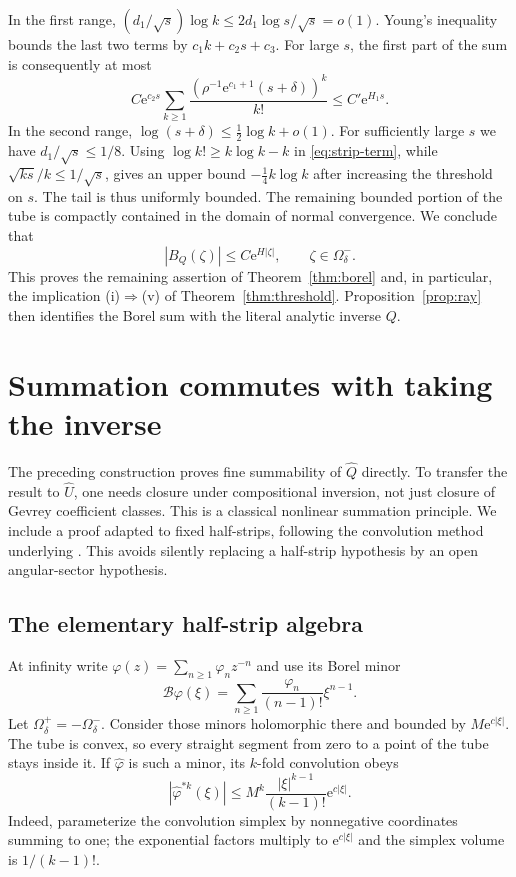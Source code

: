 \documentclass[11pt,a4paper]{article}
\numberwithin{equation}{section}
\theoremstyle{definition}
\theoremstyle{remark}
\newcommand{\U}{\widehat U}
\newcommand{\Q}{\widehat Q}
\newcommand{\ee}{\mathrm e}
\begin{document}
In the first range,
$(d_1/\sqrt s)\log k\le2d_1\log s/\sqrt s=o(1)$.
Young's inequality bounds the last two terms by $c_1k+c_2s+c_3$.
For large $s$, the first part of the sum is consequently at most
\[
 C\ee^{c_2s}\sum_{k\ge1}
       \frac{(\rho^{-1}\ee^{c_1+1}(s+\delta))^k}{k!}
 \le C'\ee^{H_1s}.
\]
In the second range, $\log(s+\delta)\le\tfrac12\log k+o(1)$.
For sufficiently large $s$ we have $d_1/\sqrt s\le1/8$.
Using $\log k!\ge k\log k-k$ in \eqref{eq:strip-term}, while
$\sqrt{ks}/k\le1/\sqrt s$, gives an upper bound
$-\tfrac14 k\log k$ after increasing the threshold on $s$.
The tail is thus uniformly bounded.  The remaining bounded portion of
the tube is compactly contained in the domain of normal convergence.
We conclude that
\begin{equation}
 |B_Q(\zeta)|\le C\ee^{H|\zeta|},\qquad \zeta\in\Omega^-_\delta.
 \label{eq:fine-growth}
\end{equation}
This proves the remaining assertion of Theorem~\ref{thm:borel} and, in
particular, the implication (i)$\Rightarrow$(v) of
Theorem~\ref{thm:threshold}.  Proposition~\ref{prop:ray} then identifies
the Borel sum with the literal analytic inverse $Q$.

\section{Summation commutes with taking the inverse}
\label{sec:nonlinear}

The preceding construction proves fine summability of $\Q$ directly.
To transfer the result to $\U$, one needs closure under compositional
inversion, not just closure of Gevrey coefficient classes.  This is a
classical nonlinear summation principle.  We include a proof adapted to
fixed half-strips, following the convolution method underlying
\cite[Sections 13 and 17]{sauzin}.  This avoids silently replacing a
half-strip hypothesis by an open angular-sector hypothesis.

\subsection{The elementary half-strip algebra}
At infinity write
$\varphi(z)=\sum_{n\ge1}\varphi_nz^{-n}$ and use its Borel minor
\[
 \mathscr B\varphi(\xi)
    =\sum_{n\ge1}\frac{\varphi_n}{(n-1)!}\xi^{n-1}.
\]
Let $\Omega^+_\delta=-\Omega^-_\delta$.  Consider those minors holomorphic
there and bounded by $M\ee^{c|\xi|}$.  The tube is convex, so every straight
segment from zero to a point of the tube stays inside it.  If $\widehat
\varphi$ is such a minor, its $k$-fold convolution obeys
\begin{equation}
 |\widehat\varphi^{*k}(\xi)|
 \le M^k\frac{|\xi|^{k-1}}{(k-1)!}\ee^{c|\xi|}.
 \label{eq:conv-bound}
\end{equation}
Indeed, parameterize the convolution simplex by nonnegative coordinates
summing to one; the exponential factors multiply to
$\ee^{c|\xi|}$ and the simplex volume is $1/(k-1)!$.
\end{document}
